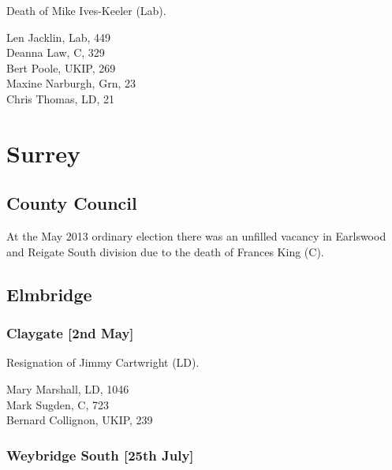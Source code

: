 \documentclass[a4paper,openany,10pt]{book}
\begin{document}

Death of Mike Ives-Keeler (Lab).



Len Jacklin, Lab, 449\\
Deanna Law, C, 329\\
Bert Poole, UKIP, 269\\
Maxine Narburgh, Grn, 23\\
Chris Thomas, LD, 21\\


\vfill

\section{Surrey}

\subsection*{County Council}

At the May 2013 ordinary election there was an unfilled vacancy in Earlswood and Reigate South division due to the death of Frances King (C).


\subsection*{Elmbridge}

\subsubsection*{Claygate \hspace*{\fill}\nolinebreak[1]%
\enspace\hspace*{\fill}
[2nd May]}


Resignation of Jimmy Cartwright (LD).



Mary Marshall, LD, 1046\\
Mark Sugden, C, 723\\
Bernard Collignon, UKIP, 239\\


\subsubsection*{Weybridge South \hspace*{\fill}\nolinebreak[1]%
\enspace\hspace*{\fill}
[25th July]}
\end{document}
